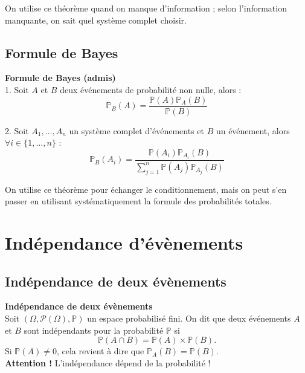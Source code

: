 \documentclass[../PolyS4.tex]{subfiles}
\begin{document}
\begin{Rmq} On utilise ce théorème quand on manque d'information ; selon l'information manquante, on sait quel système complet choisir.\\
\end{Rmq} 

\newpage

\subsection{Formule de Bayes}


\begin{Prop}
\textbf{Formule de Bayes (admis)}\\

1. Soit $A$ et $B$ deux événements de probabilité non nulle, alors :
\[
\mathbb{P}_B(A) = \frac{\mathbb{P}(A) \mathbb{P}_A(B)}{\mathbb{P}(B)}
\]

2. Soit $A_1, \ldots, A_n$ un système complet d'événements et $B$ un événement, alors $\forall i \in \{1, \ldots, n\}$ :
\[
\mathbb{P}_B(A_i) = \frac{\mathbb{P}(A_i) \mathbb{P}_{A_i}(B)}{\sum_{j=1}^{n} \mathbb{P}(A_j) \mathbb{P}_{A_j}(B)}
\]

\end{Prop}

\begin{Rmq}  On utilise ce théorème pour échanger le conditionnement, mais on peut s'en passer en utilisant systématiquement la formule des probabilités totales.\\
\end{Rmq} 









\section{Indépendance d'évènements}

\subsection{Indépendance de deux évènements}

\begin{Def}
\textbf{Indépendance de deux évènements}\\
Soit $(\Omega, \mathcal{P}(\Omega), \mathbb{P})$ un espace probabilisé fini. On dit que deux événements $A$ et $B$ sont indépendants pour la probabilité $\mathbb{P}$ si
\[
\mathbb{P} (A \cap B) = \mathbb{P} (A) \times \mathbb{P} (B).
\]
Si $\mathbb{P} (A) \neq 0$, cela revient à dire que $\mathbb{P}_A(B) = \mathbb{P} (B)$.\\
\textbf{Attention !} L'indépendance dépend de la probabilité !\\
\end{Def}
\end{document}
